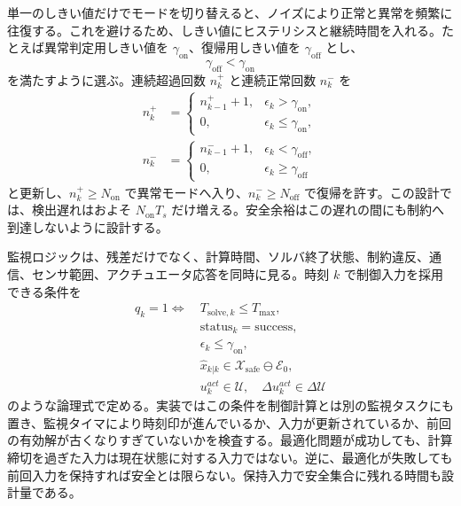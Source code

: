 単一のしきい値だけでモードを切り替えると、ノイズにより正常と異常を頻繁に往復する。これを避けるため、しきい値にヒステリシスと継続時間を入れる。たとえば異常判定用しきい値を $\gamma_{\mathrm{on}}$、復帰用しきい値を $\gamma_{\mathrm{off}}$ とし、
\begin{equation}
  \gamma_{\mathrm{off}}<\gamma_{\mathrm{on}}
\end{equation}
を満たすように選ぶ。連続超過回数 $n_k^{+}$ と連続正常回数 $n_k^{-}$ を
\begin{align}
  n_k^{+}
  &=
  \begin{cases}
    n_{k-1}^{+}+1, & \epsilon_k>\gamma_{\mathrm{on}},\\
    0, & \epsilon_k\le\gamma_{\mathrm{on}},
  \end{cases}\\
  n_k^{-}
  &=
  \begin{cases}
    n_{k-1}^{-}+1, & \epsilon_k<\gamma_{\mathrm{off}},\\
    0, & \epsilon_k\ge\gamma_{\mathrm{off}}
  \end{cases}
\end{align}
と更新し、$n_k^{+}\ge N_{\mathrm{on}}$ で異常モードへ入り、$n_k^{-}\ge N_{\mathrm{off}}$ で復帰を許す。この設計では、検出遅れはおよそ $N_{\mathrm{on}}T_s$ だけ増える。安全余裕はこの遅れの間にも制約へ到達しないように設計する。

監視ロジックは、残差だけでなく、計算時間、ソルバ終了状態、制約違反、通信、センサ範囲、アクチュエータ応答を同時に見る。時刻 $k$ で制御入力を採用できる条件を
\begin{align}
  q_k=1
  \Longleftrightarrow
  &\ T_{\mathrm{solve},k}\le T_{\max},\\
  &\ \mathrm{status}_k=\mathrm{success},\\
  &\ \epsilon_k\le\gamma_{\mathrm{on}},\\
  &\ \hat{x}_{k|k}\in\mathcal{X}_{\mathrm{safe}}\ominus\mathcal{E}_0,\\
  &\ u_k^{act}\in\mathcal{U},\quad \Delta u_k^{act}\in\Delta\mathcal{U}
\end{align}
のような論理式で定める。実装ではこの条件を制御計算とは別の監視タスクにも置き、監視タイマにより時刻印が進んでいるか、入力が更新されているか、前回の有効解が古くなりすぎていないかを検査する。最適化問題が成功しても、計算締切を過ぎた入力は現在状態に対する入力ではない。逆に、最適化が失敗しても前回入力を保持すれば安全とは限らない。保持入力で安全集合に残れる時間も設計量である。

